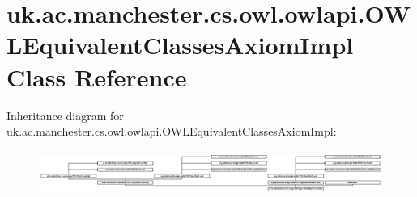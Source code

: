 \hypertarget{classuk_1_1ac_1_1manchester_1_1cs_1_1owl_1_1owlapi_1_1_o_w_l_equivalent_classes_axiom_impl}{\section{uk.\-ac.\-manchester.\-cs.\-owl.\-owlapi.\-O\-W\-L\-Equivalent\-Classes\-Axiom\-Impl Class Reference}
\label{classuk_1_1ac_1_1manchester_1_1cs_1_1owl_1_1owlapi_1_1_o_w_l_equivalent_classes_axiom_impl}
}
Inheritance diagram for uk.\-ac.\-manchester.\-cs.\-owl.\-owlapi.\-O\-W\-L\-Equivalent\-Classes\-Axiom\-Impl\-:\begin{figure}[H]
\begin{center}
\leavevmode
\includegraphics[height=1.428571cm]{classuk_1_1ac_1_1manchester_1_1cs_1_1owl_1_1owlapi_1_1_o_w_l_equivalent_classes_axiom_impl}
\end{center}
\end{figure}
